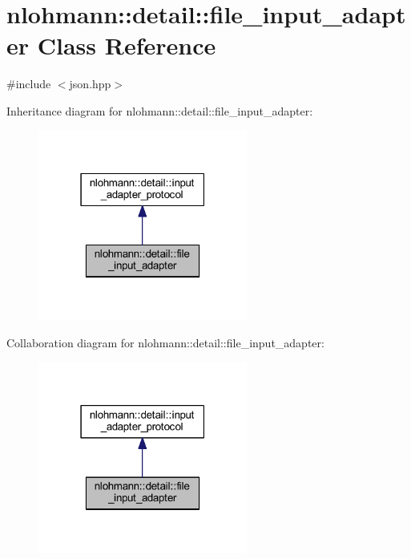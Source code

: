 \hypertarget{classnlohmann_1_1detail_1_1file__input__adapter}{}\section{nlohmann\+::detail\+::file\+\_\+input\+\_\+adapter Class Reference}
\label{classnlohmann_1_1detail_1_1file__input__adapter}


{\ttfamily \#include $<$json.\+hpp$>$}



Inheritance diagram for nlohmann\+::detail\+::file\+\_\+input\+\_\+adapter\+:
\nopagebreak
\begin{figure}[H]
\begin{center}
\leavevmode
\includegraphics[width=195pt]{classnlohmann_1_1detail_1_1file__input__adapter__inherit__graph}
\end{center}
\end{figure}


Collaboration diagram for nlohmann\+::detail\+::file\+\_\+input\+\_\+adapter\+:
\nopagebreak
\begin{figure}[H]
\begin{center}
\leavevmode
\includegraphics[width=195pt]{classnlohmann_1_1detail_1_1file__input__adapter__coll__graph}
\end{center}
\end{figure}

